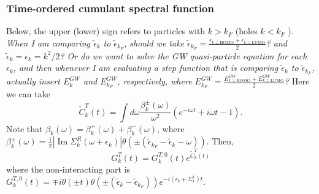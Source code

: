 \subsubsection{Time-ordered cumulant spectral function}
Below, the upper (lower) sign refers to particles with $k>k_F$ (holes $k<k_F$ ). \emph{When I am comparing $\tilde{\epsilon}_k$ to $\tilde{\epsilon}_{k_F}$, should we take $\tilde{\epsilon}_{k_F} = \frac{{\epsilon}_{k\equiv\text{HOMO}} + {\epsilon}_{k\equiv\text{LUMO}}}{2}$? and $\tilde{\epsilon}_{k} = \epsilon_k = k^2/2$? Or do we want to solve the GW quasi-particle equation for each $\epsilon_k$, and then whenever I am evaluating a step function that is comparing $\tilde{\epsilon}_k$ to $\tilde{\epsilon}_{k_F}$, actually insert $E^{GW}_k$ and $E^{GW}_{k_F}$, respectively, where $E^{GW}_{k_F} = \frac{E^{GW}_{k\equiv\text{HOMO}} + E^{GW}_{k\equiv\text{LUMO}}}{2}$?}
Here we can take 
\begin{equation}
    \tilde{C}_k^T(t)=\int d \omega \frac{\beta_k^{ \pm}(\omega)}{\omega^2}\left(e^{-i \omega t}+i \omega t-1\right) .
\end{equation}
Note that $\beta_k(\omega)=\beta_k^{+}(\omega)+\beta_k^{-}(\omega)$, where $\beta_k^{ \pm}(\omega)= \frac{1}{\pi}\left|\operatorname{Im} \Sigma_k^R\left(\omega+\epsilon_k\right)\right| \theta\left( \pm\left(\tilde{\epsilon}_{k_F}-\tilde{\epsilon}_k-\omega\right)\right)$. Then,
\begin{equation}
G_k^T(t)=G_k^{T, 0}(t) e^{\tilde{C}_k^T(t)}
\end{equation}
where the non-interacting part is $G_k^{T, 0}(t)=\mp i \theta( \pm t) \theta\left( \pm\left(\tilde{\epsilon}_k-\tilde{\epsilon}_{k_F}\right)\right) e^{-i(\epsilon_k + \Sigma_k^x) t}$.
